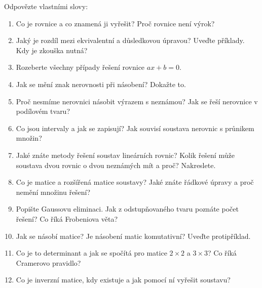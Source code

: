\begin{problem}
  Odpovězte vlastními slovy:
  \begin{enumerate}
    \item Co je rovnice a co znamená ji vyřešit? Proč rovnice není výrok?
    \item Jaký je rozdíl mezi ekvivalentní a důsledkovou úpravou? Uveďte příklady. Kdy je zkouška nutná?
    \item Rozeberte všechny případy řešení rovnice $ax + b = 0$.
    \item Jak se mění znak nerovnosti při násobení? Dokažte to.
    \item Proč nesmíme nerovnici násobit výrazem s neznámou? Jak se řeší nerovnice v podílovém tvaru?
    \item Co jsou intervaly a jak se zapisují? Jak souvisí soustava nerovnic s průnikem množin?
    \item Jaké znáte metody řešení soustav lineárních rovnic? Kolik řešení může soustava dvou rovnic o dvou neznámých mít a proč? Nakreslete.
    \item Co je matice a rozšířená matice soustavy? Jaké znáte řádkové úpravy a proč nemění množinu řešení?
    \item Popište Gaussovu eliminaci. Jak z odstupňovaného tvaru poznáte počet řešení? Co říká Frobeniova věta?
    \item Jak se násobí matice? Je násobení matic komutativní? Uveďte protipříklad.
    \item Co je to determinant a jak se spočítá pro matice $2\times 2$ a $3\times 3$? Co říká Cramerovo pravidlo?
    \item Co je inverzní matice, kdy existuje a jak pomocí ní vyřešit soustavu?
  \end{enumerate}
\end{problem}
